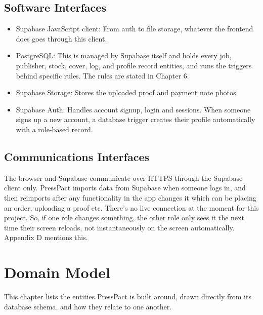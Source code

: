 \documentclass{scrreprt}
\begin{document}
\section{Software Interfaces}
\begin{itemize}
\item Supabase JavaScript client: From auth to file storage, whatever the frontend does goes through this client.
\item PostgreSQL: This is managed by Supabase itself and holds every job, publisher, stock, cover, log, and profile record entities, and runs the triggers behind specific rules. The rules are stated in Chapter 6.
\item Supabase Storage: Stores the uploaded proof and payment note photos.
\item Supabase Auth: Handles account signup, login and sessions. When someone signs up a new account, a database trigger creates their profile automatically with a role-based record.
\end{itemize}

\section{Communications Interfaces}
The browser and Supabase communicate over HTTPS through the Supabase client only.
PressPact imports data from Supabase when someone logs in, and then reimports after any functionality in the app changes it which can be placing an
order, uploading a proof etc. There's no live connection at the moment for this project. So, if one role changes something, the other role only sees it the next time their screen reloads, not instantaneously on the screen automatically. Appendix D mentions this.

\chapter{Domain Model}
This chapter lists the entities PressPact is built around, drawn directly from its database schema, and how they relate to one another.
\end{document}
